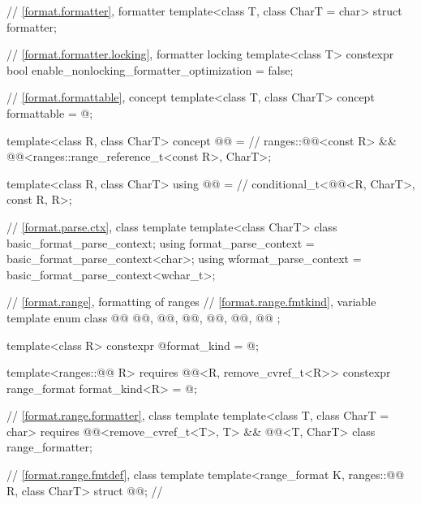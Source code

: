 \begin{codeblock}
{  // \ref{format.formatter}, formatter
  template<class T, class CharT = char> struct formatter;

  // \ref{format.formatter.locking}, formatter locking
  template<class T>
    constexpr bool enable_nonlocking_formatter_optimization = false;

  // \ref{format.formattable}, concept 
  template<class T, class CharT>
    concept formattable = @\seebelow@;

  template<class R, class CharT>
    concept @@ =                                   // \expos
      ranges::@@<const R> &&
      @@<ranges::range_reference_t<const R>, CharT>;

  template<class R, class CharT>
    using @@ =                                             // \expos
      conditional_t<@@<R, CharT>, const R, R>;

  // \ref{format.parse.ctx}, class template 
  template<class CharT> class basic_format_parse_context;
  using format_parse_context = basic_format_parse_context<char>;
  using wformat_parse_context = basic_format_parse_context<wchar_t>;

  // \ref{format.range}, formatting of ranges
  // \ref{format.range.fmtkind}, variable template 
  enum class @@ {
    @@,
    @@,
    @@,
    @@,
    @@,
    @@
  };

  template<class R>
    constexpr @\unspec@ format_kind = @\unspec@;

  template<ranges::@@ R>
    requires @@<R, remove_cvref_t<R>>
    constexpr range_format format_kind<R> = @\seebelow@;

  // \ref{format.range.formatter}, class template 
  template<class T, class CharT = char>
    requires @@<remove_cvref_t<T>, T> && @@<T, CharT>
  class range_formatter;

  // \ref{format.range.fmtdef}, class template 
  template<range_format K, ranges::@@ R, class CharT>
    struct @@;                                     // \expos

}
\end{codeblock}
